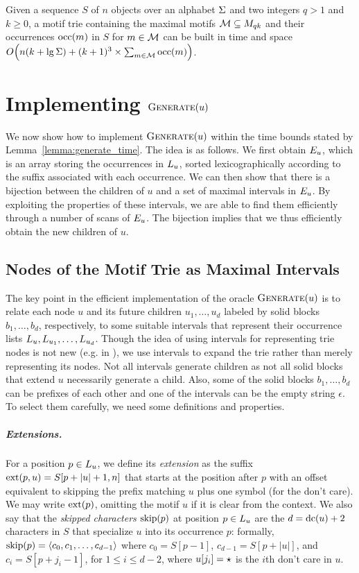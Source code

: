 \begin{theorem}\label{the:trie}
    Given a sequence $S$ of $n$ objects over an alphabet $\Sigma$ and two integers $q > 1$ and $k \geq 0$, a motif trie containing the maximal motifs $\mathcal{M} \subseteq M_{qk}$ and their occurrences $\operatorname{occ}(m)$ in $S$ for $m \in \mathcal{M}$  can be built in time and space
$O \Bigl( n (k + \lg \Sigma) + (k+1)^3 \times \sum_{m \in \mathcal{M}} \operatorname{occ}(m) \Bigr)$.
\end{theorem}


\section{Implementing $\operatorname{\textsc{Generate}}(u)$}\label{sec:generate}
We now show how to implement $\operatorname{\textsc{Generate}}(u)$ within the time bounds stated by Lemma~\ref{lemma:generate_time}. The idea is as follows. We first obtain $E_{u}$, which is an array storing the occurrences in $L_{u}$, sorted lexicographically according to the suffix associated with each occurrence. We can then show that there is a bijection between the children of $u$ and a set of maximal intervals in $E_{u}$. By exploiting the properties of these intervals, we are able to find them efficiently through a number of scans of $E_{u}$. The bijection implies that we thus efficiently obtain the new children of $u$.


\subsection{Nodes of the Motif Trie as Maximal Intervals}
\label{sub:intervals}
The key point in the efficient implementation of the oracle $\operatorname{\textsc{Generate}}(u)$ is to relate each node $u$ and its future children $u_1, \ldots, u_d$ labeled by solid blocks $b_1, \ldots, b_d$, respectively, to some suitable intervals that represent their occurrence lists $L_{u}, L_{u_1}, \ldots, L_{u_d}$. 
Though the idea of using intervals for representing trie nodes is not new (e.g. in \cite{abouelhoda2004replacing}), we use intervals to expand the trie rather than merely representing its nodes. Not all intervals generate children as not all solid blocks that extend $u$ necessarily generate a child. Also, some of the solid blocks $b_1, \ldots, b_d$ can be prefixes of each other and one of the intervals can be the empty string $\epsilon$. To select them carefully, we need some definitions and properties.

\subparagraph*{Extensions.}
%
For a position $p \in L_{u}$, we define its \emph{extension} as the suffix $\operatorname{ext}(p, u) = S[p + |u| + 1, n]$ that starts at the position after $p$ with an offset equivalent to skipping the prefix matching $u$ plus one symbol (for the don't care). We may write $\operatorname{ext}(p)$, omitting the motif $u$ if it is clear from the context. We also say that the \emph{skipped characters} $\operatorname{skip}(p)$ at position $p \in L_{u}$ are the $d=\operatorname{dc}(u)+2$ characters in $S$ that specialize $u$ into its occurrence $p$: formally,  $\operatorname{skip}(p) = \langle c_0, c_1, \ldots, c_{d-1}  \rangle$ where $c_0 = S[p-1]$, $c_{d-1} = S[p+|u|]$, and $c_i = S[p+j_i-1]$, for $1 \leq i \leq d-2$, where $u[j_i] = \star$ is the $i$th don't care in $u$. 

